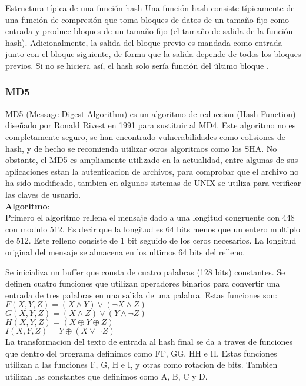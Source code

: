 \documentclass[spanish]{article}
\begin{document}
Estructura típica de una función hash
Una función hash consiste típicamente de una función de compresión que toma bloques de datos de un tamaño fijo como entrada y produce bloques de un tamaño fijo (el tamaño de salida de la función hash). Adicionalmente, la salida del bloque previo es mandada como entrada junto con el bloque siguiente, de forma que la salida depende de todos los bloques previos. Si no se hiciera así, el hash solo sería función del último bloque  .

\subsubsection{MD5}

MD5 (Message-Digest Algorithm) es un algoritmo de reduccion (Hash Function) diseñado por Ronald Rivest en 1991 para sustituir al MD4.
Este algoritmo no es completamente seguro, se han encontrado vulnerabilidades como colisiones de hash, y de hecho se recomienda utilizar otros algoritmos como los SHA. No obstante, el MD5 es ampliamente utilizado en la actualidad, entre algunas de sus aplicaciones estan la autenticacion de archivos, para comprobar que el archivo no ha sido modificado, tambien en algunos sistemas de UNIX se utiliza para verificar las claves de usuario.\\

\textbf{Algoritmo}:\\

Primero el algoritmo rellena el mensaje dado a una longitud congruente con 448 con modulo 512. Es decir que la longitud es 64 bits menos que un entero multiplo de 512. Este relleno consiste de 1 bit seguido de los ceros necesarios.
La longitud original del mensaje se almacena en los ultimos 64 bits del relleno.

Se inicializa un buffer que consta de cuatro palabras (128 bits) constantes.
Se definen cuatro funciones que utilizan operadores binarios para convertir una entrada de tres palabras en una salida de una palabra. Estas funciones son:
$F(X,Y,Z) = (X \wedge Y) \vee (\neg X \wedge Z)$\\
$G(X,Y,Z) = (X \wedge Z) \vee (Y \wedge \neg Z)$\\
$H(X,Y,Z) = (X \oplus Y \oplus Z)$\\
$I(X,Y,Z) = Y \oplus (X \vee \neg Z)$\\

La transformacion del texto de entrada al hash final se da a traves de funciones que dentro del programa definimos como FF, GG, HH e II. Estas funciones utilizan a las funciones F, G, H e I, y otras como rotacion de bits. Tambien utilizan las constantes que definimos como A, B, C y D.
\end{document}
